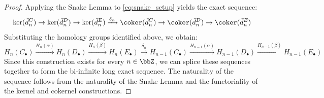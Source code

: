 \begin{proof}
Applying the Snake Lemma to \eqref{eq:snake_setup} yields the exact sequence:
\[
\ker(\bar{d}_n^C) \to \ker(\bar{d}_n^D) \to \ker(\bar{d}_n^E) \xrightarrow{\delta_n} \coker(\bar{d}_n^C) \to \coker(\bar{d}_n^D) \to \coker(\bar{d}_n^E)
\]
Substituting the homology groups identified above, we obtain:
\[
H_n(C_\bullet) \xrightarrow{H_n(\alpha)} H_n(D_\bullet) \xrightarrow{H_n(\beta)} H_n(E_\bullet) \xrightarrow{\delta_n} H_{n-1}(C_\bullet) \xrightarrow{H_{n-1}(\alpha)} H_{n-1}(D_\bullet) \xrightarrow{H_{n-1}(\beta)} H_{n-1}(E_\bullet)
\]
Since this construction exists for every $n \in \bbZ$, we can splice these sequences together to form the bi-infinite long exact sequence. The naturality of the sequence follows from the naturality of the Snake Lemma and the functoriality of the kernel and cokernel constructions.
\end{proof}